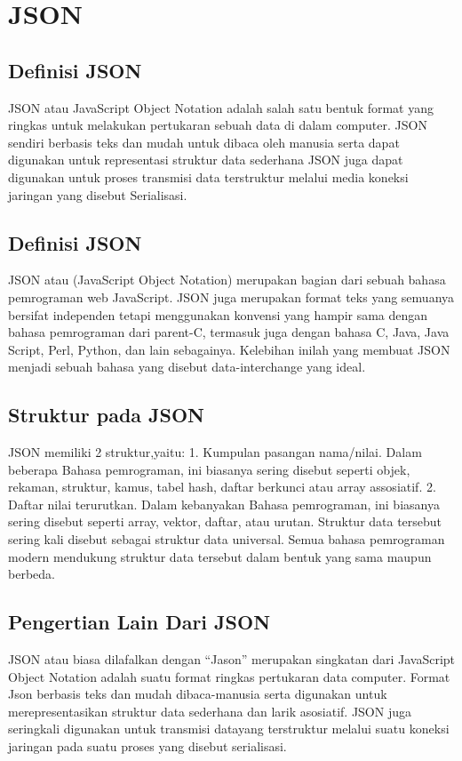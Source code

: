 \section{JSON}
\subsection{Definisi JSON}
JSON atau JavaScript Object Notation adalah salah satu bentuk format yang ringkas untuk melakukan pertukaran sebuah data di dalam computer. JSON sendiri berbasis teks dan mudah untuk dibaca oleh manusia serta dapat digunakan untuk representasi struktur data sederhana JSON juga dapat digunakan untuk proses transmisi data terstruktur melalui media koneksi jaringan yang disebut Serialisasi.
\subsection{Definisi JSON}
JSON atau (JavaScript Object Notation) merupakan  bagian  dari  sebuah bahasa  pemrograman web  JavaScript.  JSON juga merupakan format teks yang semuanya bersifat independen tetapi menggunakan konvensi yang  hampir sama  dengan  bahasa  pemrograman  dari  parent-C,  termasuk juga dengan  bahasa C,  Java,  Java Script,  Perl, Python,  dan lain sebagainya.  Kelebihan  inilah  yang  membuat  JSON  menjadi  sebuah  bahasa yang disebut  data-interchange yang ideal.
\subsection{Struktur pada JSON}
JSON memiliki 2 struktur,yaitu:
1.	Kumpulan pasangan nama/nilai.
Dalam beberapa Bahasa pemrograman, ini biasanya sering disebut seperti objek, rekaman, struktur, kamus, tabel hash, daftar berkunci atau array assosiatif.
2.	Daftar nilai terurutkan.
Dalam kebanyakan Bahasa pemrograman, ini biasanya sering disebut seperti array, vektor, daftar, atau urutan.
Struktur data tersebut sering kali disebut sebagai struktur data universal. Semua bahasa pemrograman modern mendukung struktur data tersebut dalam bentuk yang sama maupun berbeda.
\subsection{Pengertian Lain Dari JSON}
JSON atau biasa dilafalkan dengan “Jason” merupakan singkatan dari JavaScript Object Notation adalah suatu format ringkas pertukaran data computer. Format Json berbasis teks dan mudah dibaca-manusia serta digunakan untuk merepresentasikan struktur data sederhana dan larik asosiatif. JSON juga seringkali digunakan untuk transmisi datayang  terstruktur melalui suatu koneksi jaringan pada suatu proses yang disebut serialisasi.
